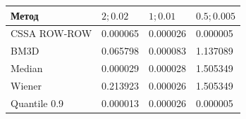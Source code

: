\begin{tabular}{|l|l|l|l|}
\hline
Метод & $2; 0.02$ & $1; 0.01$ & $0.5; 0.005$ \\
\hline
CSSA ROW-ROW & 0.000065 & 0.000026 & 0.000005 \\
\hline
BM3D & 0.065798 & 0.000083 & 1.137089 \\
\hline
Median & 0.000029 & 0.000028 & 1.505349 \\
\hline
Wiener & 0.213923 & 0.000026 & 1.505349 \\
\hline
Quantile 0.9 & 0.000013 & 0.000026 & 0.000005 \\
\hline
\end{tabular}
